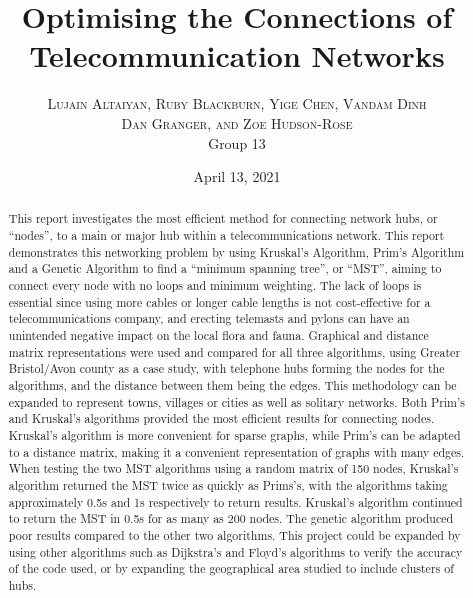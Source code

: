 \documentclass[twocolumn]{article}
\title{Optimising the Connections of Telecommunication Networks}
\author{%
\textsc{Lujain Altaiyan, Ruby Blackburn, Yige  Chen, Vandam Dinh} \\
\textsc{Dan Granger, and Zoe Hudson-Rose
} \\[1ex] 
\normalsize Group 13 \\ 
}
\date{April 13, 2021}
\begin{document}

\maketitle



\begin{abstract} 
This report investigates the most efficient method for connecting network hubs, or “nodes”, to a main or major hub within a telecommunications network. This report demonstrates this networking problem by using Kruskal’s Algorithm, Prim’s Algorithm and a Genetic Algorithm to find a “minimum spanning tree”, or “MST”, aiming to connect every node with no loops and minimum weighting. The lack of loops is essential since using more cables or longer cable lengths is not cost-effective for a telecommunications company, and erecting telemasts and pylons can have an unintended negative impact on the local flora and fauna. Graphical and distance matrix representations were used and compared for all three algorithms, using Greater Bristol/Avon county as a case study, with telephone hubs forming the nodes for the algorithms, and the distance between them being the edges. This methodology can be expanded to represent towns, villages or cities as well as solitary networks. Both Prim's and Kruskal's algorithms provided the most efficient results for connecting nodes. Kruskal's algorithm is more convenient for sparse graphs, while Prim's can be adapted to a distance matrix, making it a convenient representation of graphs with many edges. When testing the two MST algorithms using a random matrix of 150 nodes, Kruskal's algorithm returned the MST twice as quickly as Prims's, with the algorithms taking approximately 0.5s and 1s respectively to return results. Kruskal's algorithm continued to return the MST in 0.5s for as many as 200 nodes. The genetic algorithm produced poor results compared to the other two algorithms. This project could be expanded by using other algorithms such as Dijkstra's and Floyd's algorithms to verify the accuracy of the code used, or by expanding the geographical area studied to include clusters of hubs. 
\end{abstract}

\end{document}
